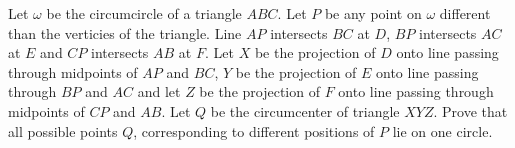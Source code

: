 Let $\omega$ be the circumcircle of a triangle $ABC$. Let $P$ be any point on $\omega$ different than the verticies of the triangle.
Line $AP$ intersects $BC$ at $D$, $BP$ intersects $AC$ at $E$ and $CP$ intersects $AB$ at $F$.  Let $X$ be the projection of $D$ onto line passing through midpoints of $AP$ and $BC$, $Y$ be the projection of $E$ onto line passing through $BP$ and $AC$ and let $Z$ be the projection of $F$ onto line passing through midpoints of $CP$ and $AB$. Let $Q$ be the circumcenter of triangle $XYZ$. Prove that all possible points $Q$, corresponding to different positions of $P$ lie on one circle.